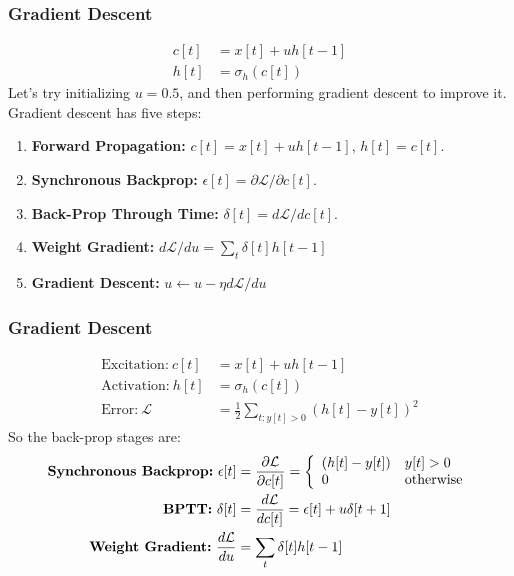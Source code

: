 \documentclass{beamer}
\begin{document}
\begin{frame}
  \frametitle{Gradient Descent}

  \begin{align*}
    c[t] &= x[t]+uh[t-1]\\
    h[t] &= \sigma_h\left(c[t]\right)
  \end{align*}
  Let's try initializing $u=0.5$, and then performing gradient descent
  to improve it.  Gradient descent has five steps:
  \begin{enumerate}
  \item {\bf Forward Propagation:} $c[t]=x[t]+uh[t-1]$, $h[t]=c[t]$.
  \item {\bf Synchronous Backprop:} $\epsilon[t]=\partial {\mathcal L}/\partial c[t]$.
  \item {\bf Back-Prop Through Time:} $\delta[t]=d{\mathcal L}/dc[t]$.
  \item {\bf Weight Gradient:} $d{\mathcal L}/du=\sum_t \delta[t]h[t-1]$
  \item {\bf Gradient Descent:} $u\leftarrow u-\eta d{\mathcal L}/du$
  \end{enumerate}
\end{frame}

\begin{frame}
  \frametitle{Gradient Descent}
  \begin{align*}
    \mbox{Excitation:}~c[t] &= x[t]+uh[t-1]\\
    \mbox{Activation:}~h[t] &= \sigma_h\left(c[t]\right)\\
    \mbox{Error:}~{\mathcal L} &= \frac{1}{2}\sum_{t:y[t]>0} \left(h[t]-y[t]\right)^2
  \end{align*}
  So the back-prop stages are:
  \begin{align*}
    \mbox{\bf Synchronous Backprop:}~\epsilon[t] &=\frac{\partial {\mathcal L}}{\partial c[t]}=
    \left\{\begin{array}{ll} (h[t]-y[t]) & y[t]>0\\0&\mbox{otherwise}\end{array}\right.\\
    \mbox{\bf BPTT:}~\delta[t] &=\frac{d{\mathcal L}}{dc[t]}= \epsilon[t]+u\delta[t+1]\\
    \mbox{\bf Weight Gradient:}~\frac{d{\mathcal L}}{du}&=\sum_t \delta[t]h[t-1]
  \end{align*}
\end{frame}
\end{document}
